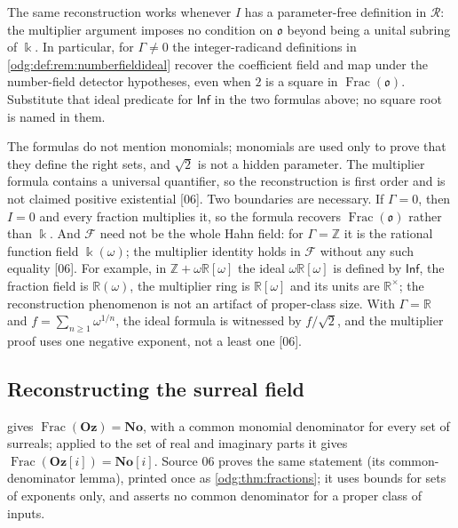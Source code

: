 \documentclass[11pt,oneside]{article}
\numberwithin{equation}{section}
\theoremstyle{definition}
\theoremstyle{remark}
\newcommand{\No}{\mathbf{No}}
\newcommand{\Oz}{\mathbf{Oz}}
\newcommand{\Z}{\mathbb Z}
\newcommand{\R}{\mathbb R}
\newcommand{\Frac}{\operatorname{Frac}}
\newcommand{\src}[1]{\textup{\textsf{\small[#1]}}}
\newcommand{\Og}{\Oz[i]}
\begin{document}
The same reconstruction works whenever $I$ has a parameter-free definition
in $\mathcal R$: the multiplier argument imposes no condition on
$\mathfrak o$ beyond being a unital subring of $\Bbbk$. In particular, for
$\Gamma\ne0$ the integer-radicand definitions in
\cref{odg:def:rem:numberfieldideal} recover the coefficient field and map
under the number-field detector hypotheses, even when $2$ is a square in
$\Frac(\mathfrak o)$. Substitute that ideal predicate for $\mathsf{Inf}$ in
the two formulas above; no square root is named in them.

The formulas do not mention monomials; monomials are used only to prove that
they define the right sets, and $\sqrt2$ is not a hidden parameter. The
multiplier formula contains a universal quantifier, so the reconstruction is
first order and is not claimed positive existential \src{06}. Two boundaries
are necessary. If $\Gamma=0$, then $I=0$ and every fraction multiplies it, so
the formula recovers $\Frac(\mathfrak o)$ rather than $\Bbbk$. And $\mathcal F$
need not be the whole Hahn field: for $\Gamma=\Z$ it is the rational function
field $\Bbbk(\omega)$; the multiplier identity holds in $\mathcal F$ without any
such equality \src{06}. For example, in $\Z+\omega\R[\omega]$ the ideal
$\omega\R[\omega]$ is defined by $\mathsf{Inf}$, the fraction field is
$\R(\omega)$, the multiplier ring is $\R[\omega]$ and its units are $\R^\times$;
the reconstruction phenomenon is not an artifact of proper-class size. With
$\Gamma=\R$ and $f=\sum_{n\ge1}\omega^{1/n}$, the ideal formula is witnessed by
$f/\sqrt2$, and the multiplier proof uses one negative exponent, not a least
one \src{06}.

\subsection{Reconstructing the surreal field}

 gives $\Frac(\Oz)=\No$, with a common monomial
denominator for every set of surreals; applied to the set of real and
imaginary parts it gives $\Frac(\Og)=\No[i]$. Source 06 proves the same
statement (its common-denominator lemma), printed once as
\cref{odg:thm:fractions}; it uses bounds for sets of exponents only, and asserts
no common denominator for a proper class of inputs.
\end{document}
